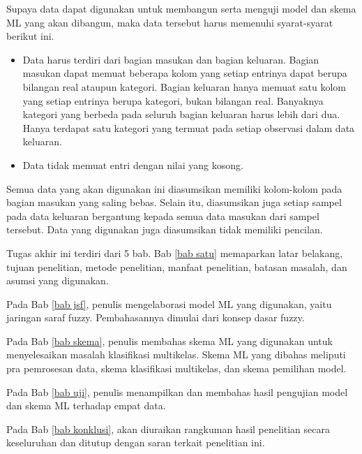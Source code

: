 \noindent Supaya data dapat digunakan untuk membangun serta menguji model dan skema ML yang akan dibangun, maka data tersebut harus memenuhi syarat-syarat berikut ini.
\begin{itemize}
    \item Data harus terdiri dari bagian masukan dan bagian keluaran. Bagian masukan dapat memuat beberapa kolom yang setiap entrinya dapat berupa bilangan real ataupun kategori. Bagian keluaran hanya memuat satu kolom yang setiap entrinya berupa kategori, bukan bilangan real. Banyaknya kategori yang berbeda pada seluruh bagian keluaran harus lebih dari dua. Hanya terdapat satu kategori yang termuat pada setiap observasi dalam data keluaran.
    \item Data tidak memuat entri dengan nilai yang kosong.
\end{itemize}
Semua data yang akan digunakan ini diasumsikan memiliki kolom-kolom pada bagian masukan yang saling bebas. Selain itu, diasumsikan juga setiap sampel pada data keluaran bergantung kepada semua data masukan dari sampel tersebut. Data yang digunakan juga diasumsikan tidak memiliki pencilan.

\noindent Tugas akhir ini terdiri dari 5 bab. Bab \ref{bab satu} memaparkan latar belakang, tujuan penelitian, metode penelitian, manfaat penelitian, batasan masalah, dan asumsi yang digunakan.

\noindent Pada Bab \ref{bab jsf}, penulis mengelaborasi model ML yang digunakan, yaitu jaringan saraf fuzzy. Pembahasannya dimulai dari konsep dasar fuzzy.

\noindent Pada Bab \ref{bab skema}, penulis membahas skema ML yang digunakan untuk menyelesaikan masalah klasifikasi multikelas. Skema ML yang dibahas meliputi pra pemrosesan data, skema klasifikasi multikelas, dan skema pemilihan model.

\noindent Pada Bab \ref{bab uji}, penulis menampilkan dan membahas hasil pengujian model dan skema ML terhadap empat data. 

\noindent Pada Bab \ref{bab konklusi}, akan diuraikan rangkuman hasil penelitian secara keseluruhan dan ditutup dengan saran terkait penelitian ini.